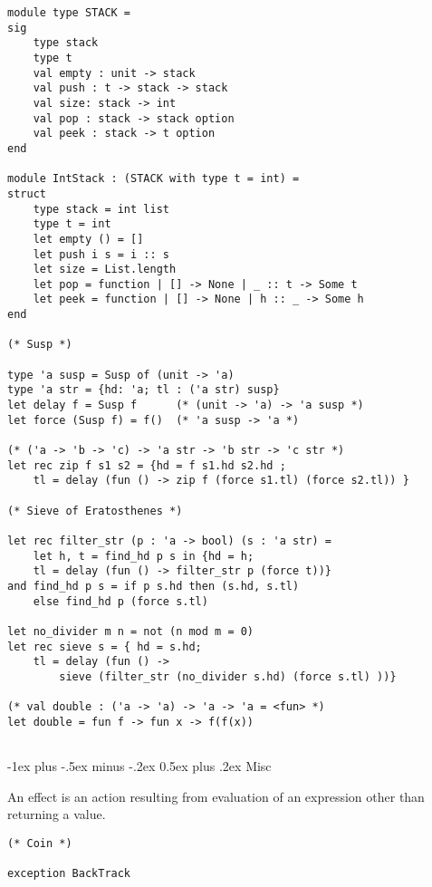 \documentclass[12pt]{article}
\makeatletter
\renewcommand{\section}{\@startsection{section}{1}{0mm}%
                                    {-1ex plus -.5ex minus -.2ex}%
                                    {0.5ex plus .2ex}%
                                    {\normalfont\large\bfseries\color{header}}}
\makeatother
\begin{document}
\pagebreak

\begin{multicols}{2}

\begin{lstlisting}
module type STACK =
sig
    type stack
    type t
    val empty : unit -> stack
    val push : t -> stack -> stack
    val size: stack -> int
    val pop : stack -> stack option
    val peek : stack -> t option
end

module IntStack : (STACK with type t = int) =
struct
    type stack = int list
    type t = int
    let empty () = []
    let push i s = i :: s
    let size = List.length
    let pop = function | [] -> None | _ :: t -> Some t
    let peek = function | [] -> None | h :: _ -> Some h
end

(* Susp *)

type 'a susp = Susp of (unit -> 'a)
type 'a str = {hd: 'a; tl : ('a str) susp}
let delay f = Susp f      (* (unit -> 'a) -> 'a susp *)
let force (Susp f) = f()  (* 'a susp -> 'a *)

(* ('a -> 'b -> 'c) -> 'a str -> 'b str -> 'c str *)
let rec zip f s1 s2 = {hd = f s1.hd s2.hd ; 
    tl = delay (fun () -> zip f (force s1.tl) (force s2.tl)) }

(* Sieve of Eratosthenes *)

let rec filter_str (p : 'a -> bool) (s : 'a str) =
    let h, t = find_hd p s in {hd = h; 
    tl = delay (fun () -> filter_str p (force t))}
and find_hd p s = if p s.hd then (s.hd, s.tl)
    else find_hd p (force s.tl)

let no_divider m n = not (n mod m = 0)    
let rec sieve s = { hd = s.hd; 
    tl = delay (fun () -> 
        sieve (filter_str (no_divider s.hd) (force s.tl) ))}

(* val double : ('a -> 'a) -> 'a -> 'a = <fun> *)
let double = fun f -> fun x -> f(f(x))


\end{lstlisting}

\section{Misc}

An effect is an action resulting from evaluation of an expression other than returning a value.

\columnbreak

\begin{lstlisting}
(* Coin *)

exception BackTrack


\end{lstlisting}
\end{multicols}
\end{document}
